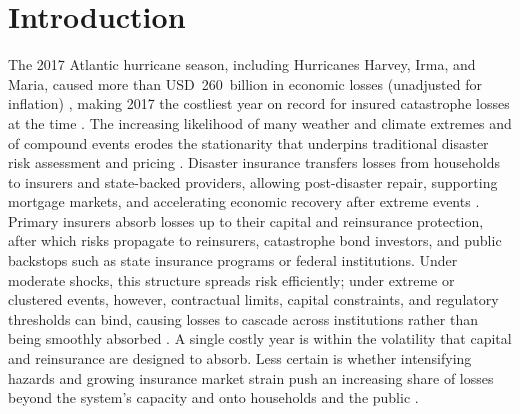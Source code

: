 \documentclass[fleqn,10pt]{wlscirep}
\begin{document}
\section{Introduction}
The 2017 Atlantic hurricane season, including Hurricanes Harvey, Irma, and Maria, caused more than USD~260~billion in economic losses (unadjusted for inflation) \cite{noaa_billion_2025}, making 2017 the costliest year on record for insured catastrophe losses at the time \cite{swissre_sigma_2018_01}. The increasing likelihood of many weather and climate extremes \cite{Seneviratne2021_WGICH11} and of compound events \cite{zscheischler_future_2018} erodes the stationarity that underpins traditional disaster risk assessment and pricing \cite{kousky_role_2019}.
Disaster insurance transfers losses from households to insurers and state-backed providers, allowing post-disaster repair, supporting mortgage markets, and accelerating economic recovery after extreme events \cite{gallagher_household_2017, kousky_role_2019}. Primary insurers absorb losses up to their capital and reinsurance protection, after which risks propagate to reinsurers, catastrophe bond investors, and public backstops such as state insurance programs or federal institutions. Under moderate shocks, this structure spreads risk efficiently; under extreme or clustered events, however, contractual limits, capital constraints, and regulatory thresholds can bind, causing losses to cascade across institutions rather than being smoothly absorbed \cite{kunreuther_learning_2010, jarzabkowski_disaster_2023, kousky_insurance_2024}. A single costly year is within the volatility that capital and reinsurance are designed to absorb. Less certain is whether intensifying hazards and growing insurance market strain push an increasing share of losses beyond the system's capacity and onto households and the public \cite{cummins_systemic_2014, jung_physical_2023}.\medskip
\end{document}
